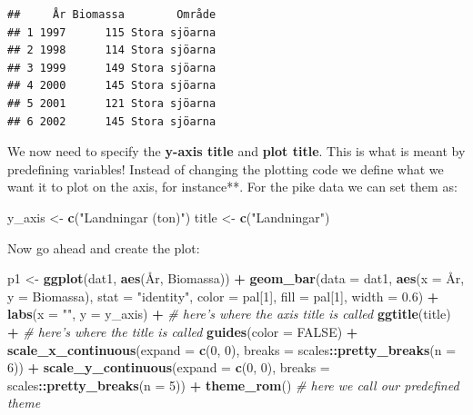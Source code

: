 \documentclass[]{article}
\newenvironment{Shaded}{\begin{snugshade}}{\end{snugshade}}
\newcommand{\KeywordTok}[1]{\textcolor[rgb]{0.13,0.29,0.53}{\textbf{#1}}}
\newcommand{\DataTypeTok}[1]{\textcolor[rgb]{0.13,0.29,0.53}{#1}}
\newcommand{\DecValTok}[1]{\textcolor[rgb]{0.00,0.00,0.81}{#1}}
\newcommand{\FloatTok}[1]{\textcolor[rgb]{0.00,0.00,0.81}{#1}}
\newcommand{\StringTok}[1]{\textcolor[rgb]{0.31,0.60,0.02}{#1}}
\newcommand{\CommentTok}[1]{\textcolor[rgb]{0.56,0.35,0.01}{\textit{#1}}}
\newcommand{\OtherTok}[1]{\textcolor[rgb]{0.56,0.35,0.01}{#1}}
\newcommand{\OperatorTok}[1]{\textcolor[rgb]{0.81,0.36,0.00}{\textbf{#1}}}
\newcommand{\NormalTok}[1]{#1}
\begin{document}
\begin{verbatim}
##     År Biomassa        Område
## 1 1997      115 Stora sjöarna
## 2 1998      114 Stora sjöarna
## 3 1999      149 Stora sjöarna
## 4 2000      145 Stora sjöarna
## 5 2001      121 Stora sjöarna
## 6 2002      145 Stora sjöarna
\end{verbatim}

We now need to specify the \textbf{y-axis title} and \textbf{plot
title}. This is what is meant by predefining variables! Instead of
changing the plotting code we define what we want it to plot on the
axis, for instance**. For the pike data we can set them as:

\begin{Shaded}
\begin{Highlighting}[]
\NormalTok{y_axis <-}\StringTok{ }\KeywordTok{c}\NormalTok{(}\StringTok{"Landningar (ton)"}\NormalTok{)}
\NormalTok{title  <-}\StringTok{ }\KeywordTok{c}\NormalTok{(}\StringTok{"Landningar"}\NormalTok{)}
\end{Highlighting}
\end{Shaded}

Now go ahead and create the plot:

\begin{Shaded}
\begin{Highlighting}[]
\NormalTok{p1 <-}\StringTok{ }\KeywordTok{ggplot}\NormalTok{(dat1, }\KeywordTok{aes}\NormalTok{(År, Biomassa)) }\OperatorTok{+}
\StringTok{  }\KeywordTok{geom_bar}\NormalTok{(}\DataTypeTok{data =}\NormalTok{ dat1, }
           \KeywordTok{aes}\NormalTok{(}\DataTypeTok{x =}\NormalTok{ År, }\DataTypeTok{y =}\NormalTok{ Biomassa), }\DataTypeTok{stat =} \StringTok{"identity"}\NormalTok{, }\DataTypeTok{color =}\NormalTok{ pal[}\DecValTok{1}\NormalTok{], }\DataTypeTok{fill =}\NormalTok{ pal[}\DecValTok{1}\NormalTok{], }
           \DataTypeTok{width =} \FloatTok{0.6}\NormalTok{) }\OperatorTok{+}
\StringTok{  }\KeywordTok{labs}\NormalTok{(}\DataTypeTok{x =} \StringTok{""}\NormalTok{, }\DataTypeTok{y =}\NormalTok{ y_axis) }\OperatorTok{+}\StringTok{ }\CommentTok{# here's where the axis title is called}
\StringTok{  }\KeywordTok{ggtitle}\NormalTok{(title) }\OperatorTok{+}\StringTok{           }\CommentTok{# here's where the title is called}
\StringTok{  }\KeywordTok{guides}\NormalTok{(}\DataTypeTok{color  =} \OtherTok{FALSE}\NormalTok{) }\OperatorTok{+}
\StringTok{  }\KeywordTok{scale_x_continuous}\NormalTok{(}\DataTypeTok{expand =} \KeywordTok{c}\NormalTok{(}\DecValTok{0}\NormalTok{, }\DecValTok{0}\NormalTok{), }\DataTypeTok{breaks =}\NormalTok{ scales}\OperatorTok{::}\KeywordTok{pretty_breaks}\NormalTok{(}\DataTypeTok{n =} \DecValTok{6}\NormalTok{)) }\OperatorTok{+}
\StringTok{  }\KeywordTok{scale_y_continuous}\NormalTok{(}\DataTypeTok{expand =} \KeywordTok{c}\NormalTok{(}\DecValTok{0}\NormalTok{, }\DecValTok{0}\NormalTok{), }\DataTypeTok{breaks =}\NormalTok{ scales}\OperatorTok{::}\KeywordTok{pretty_breaks}\NormalTok{(}\DataTypeTok{n =} \DecValTok{5}\NormalTok{)) }\OperatorTok{+}
\StringTok{  }\KeywordTok{theme_rom}\NormalTok{()                }\CommentTok{# here we call our predefined theme}
\end{Highlighting}
\end{Shaded}
\end{document}
